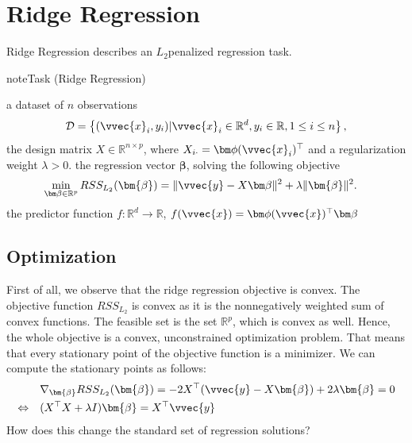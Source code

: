 \documentclass[letterpaper,10pt,english]{jupyterBook}
\begin{document}
\sphinxstepscope


\section{Ridge Regression}
\label{\detokenize{regression_ridge:ridge-regression}}\label{\detokenize{regression_ridge::doc}}
\sphinxAtStartPar
Ridge Regression describes an \(L_2\)\sphinxhyphen{}penalized regression task.

\begin{sphinxadmonition}{note}{Task (Ridge Regression)}

\sphinxAtStartPar
{} a dataset of \(n\) observations
\begin{equation*}\mathcal{D}=\left\{(\vvec{x}_i,y_i)\vert \vvec{x}_i\in\mathbb{R}^{d}, y_i\in\mathbb{R}, 1\leq i \leq n\right\},\end{equation*}
\sphinxAtStartPar
the design matrix \(X\in\mathbb{R}^{n\times p}\), where \(X_{i\cdot}=\bm\phi(\vvec{x}_i)^\top\) and a regularization weight \(\lambda>0\). the regression vector \(\bm\beta\), solving the following objective
\label{equation:regression_ridge:83243cc8-5156-400b-a454-2f51e4169e32}\begin{align}
    \min_{\bm\beta\in\mathbb{R}^p} RSS_{L_2}(\bm{\beta})&= \lVert \vvec{y}-X\bm\beta\rVert^2 +\lambda \lVert\bm{\beta}\rVert^2. 
\end{align}
\sphinxAtStartPar
{} the predictor function \(f:\mathbb{R}^d\rightarrow\mathbb{R}\), \(f(\vvec{x})=\bm\phi(\vvec{x})^\top\bm\beta\)
\end{sphinxadmonition}


\subsection{Optimization}
\label{\detokenize{regression_ridge:optimization}}
\sphinxAtStartPar
First of all, we observe that the ridge regression objective is convex. The objective function \(RSS_{L_2}\) is convex as it is the nonnegatively weighted sum of convex functions. The feasible set is the set \(\mathbb{R}^p\), which is convex as well. Hence, the whole objective is a convex, unconstrained optimization problem. That means that every stationary point of the objective function is a minimizer. We can compute the stationary points as follows:
\begin{equation}\label{equation:regression_ridge:eq:ridge}
\begin{split}\begin{align*}
    &\nabla_{\bm{\beta}} RSS_{L_2}(\bm{\beta})= -2X^\top(\vvec{y}-X\bm{\beta}) +2\lambda\bm{\beta} =0 \\
    \Leftrightarrow\quad & (X^\top X+\lambda I){\bm{\beta}} = X^\top \vvec{y}
\end{align*}\end{split}
\end{equation}
\sphinxAtStartPar
How does this change the standard set of regression solutions?
\end{document}
